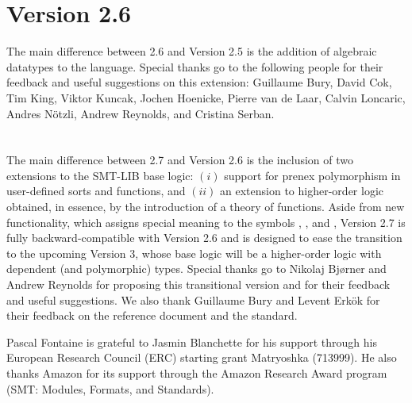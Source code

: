 \section*{Version 2.6}

The main difference between 2.6 and Version 2.5 is the addition of algebraic datatypes to the language.
Special thanks go to the following people
for their feedback and useful suggestions on this extension:
Guillaume Bury,
David Cok,
Tim King,
Viktor Kuncak,
Jochen Hoenicke,
Pierre van de Laar,
Calvin Loncaric,
Andres N{\"o}tzli,
Andrew Reynolds,
and
Cristina Serban.

\section*{\thisversion}

\begin{newver}
The main difference between 2.7 and Version 2.6 is the inclusion of two extensions to
the SMT-LIB base logic:
$(i)$ support for prenex polymorphism in user-defined sorts and functions, and
$(ii)$ an extension to higher-order logic obtained, 
in essence, by the introduction of a theory of functions.
Aside from new functionality, which assigns special meaning 
to the symbols \ter{\_}, , and \ter{->},  
Version 2.7 is fully backward-compatible with Version 2.6
and is designed to ease the transition to the upcoming Version 3,
whose base logic will be a higher-order logic with dependent (and polymorphic)
types.
Special thanks go to 
Nikolaj Bj{\o}rner and
Andrew Reynolds for proposing this transitional version and 
for their feedback and useful suggestions.
We also thank Guillaume Bury and Levent Erkök for their feedback on the reference document and the standard.

Pascal Fontaine is grateful to Jasmin Blanchette for his support through his European Research Council (ERC) starting grant Matryoshka (713999).  
He also thanks Amazon for its support through the Amazon Research Award program 
(SMT: Modules, Formats, and Standards).
\end{newver}
